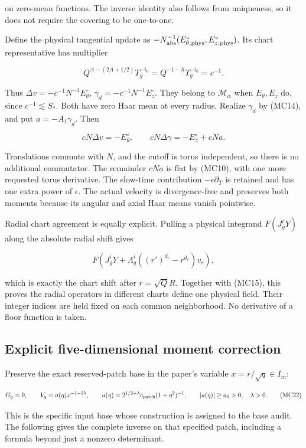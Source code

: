 \documentclass[10pt,a4paper]{article}
\begin{document}
on zero-mean functions. The inverse identity also follows from uniqueness, so it does not require the covering to be one-to-one.

Define the physical tangential update as \(-N_{\rm abs}^{-1}(E_{\theta,\rm phys}^\circ,E_{z,\rm phys}^\circ)\). Its chart representative has multiplier

\[
Q^{A-(2A+1/2)}T_g^{-i_0}=Q^{-1-h}T_g^{-i_0}=c^{-1}.
\]

Thus \(\Delta v=-c^{-1}N^{-1}E_\theta^\circ\), \(\gamma_d=-c^{-1}N^{-1}E_z^\circ\). They belong to \(\mathcal M_\alpha\) when \(E_\theta,E_z\) do, since \(c^{-1}\lesssim S_*\). Both have zero Haar mean at every radius. Realize \(\gamma_d\) by (MC14), and put \(a=-A_1\gamma_d\). Then

\[
cN\Delta v=-E_\theta^\circ,
\qquad cN\Delta\gamma=-E_z^\circ+cNa.
\tag{MC21}
\]

Translations commute with \(N\), and the cutoff is torus independent, so there is no additional commutator. The remainder \(cNa\) is flat by (MC10), with one more requested torus derivative. The slow-time contribution \(-\epsilon\partial_T\) is retained and has one extra power of \(\epsilon\). The actual velocity is divergence-free and preserves both moments because its angular and axial Haar means vanish pointwise.

Radial chart agreement is equally explicit. Pulling a physical integrand \(F(J_g^iY)\) along the absolute radial shift gives

\[
F(J_g^iY+\Lambda_g^i((r')^{d_r}-r^{d_r})v_r),
\]

which is exactly the chart shift after \(r=\sqrt Q R\). Together with (MC15), this proves the radial operators in different charts define one physical field. Their integer indices are held fixed on each common neighborhood. No derivative of a floor function is taken.

\subsection{Explicit five-dimensional moment correction}

Preserve the exact reserved-patch base in the paper's variable \(x=r/\sqrt q\in I_m\):

\[
G_q=0,\qquad V_q=a(\eta)x^{-1-2\lambda},\qquad
a(\eta)=2^{1/2+\lambda}c_{\rm patch}(1+\eta^2)^{-1},
\qquad |a(\eta)|\ge a_0>0,\quad\lambda>0.
\tag{MC22}
\]

This is the specific input base whose construction is assigned to the base audit. The following gives the complete inverse on that specified patch, including a formula beyond just a nonzero determinant.
\end{document}
